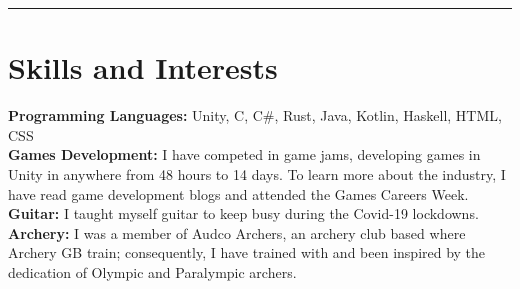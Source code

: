 \documentclass{article}
\newcommand{\mrule} {\null\noindent\rule{\textwidth}{0.4pt}}
\begin{document}
\mrule


\section*{Skills and Interests}


\textbf{Programming Languages:} Unity, C, C\#, Rust, Java, Kotlin, Haskell, HTML, CSS\\
\noindent\textbf{Games Development:} I have competed in game jams, developing games in Unity in anywhere from 48 hours to 14 days. 
To learn more about the industry, I have read game development blogs and attended the Games Careers Week.\\

\noindent\textbf{Guitar:} I taught myself guitar to keep busy during the Covid-19 lockdowns.\\  
\noindent\textbf{Archery:} I was a member of Audco Archers, an archery club based where Archery GB train; consequently,
I have trained with and been inspired by the dedication of Olympic and Paralympic archers.\\
\end{document}
